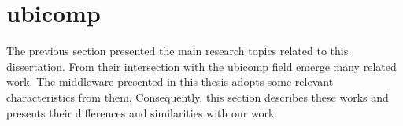 \section{\acl{ubicomp}}
\label{sec:soa_ubicomp}

The previous section presented the main research topics related to this dissertation.
From their intersection with the \ac{ubicomp} field emerge many related work.
The middleware presented in this thesis adopts some relevant characteristics from them.
Consequently, this section describes these works and presents their differences and similarities with our work.


%
%
%
%
